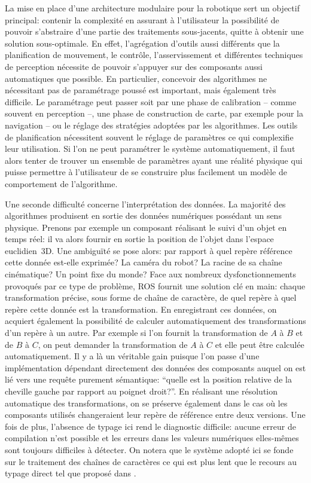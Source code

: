 La mise en place d'une architecture modulaire pour la robotique sert
un objectif principal: contenir la complexité en assurant à
l'utilisateur la possibilité de pouvoir s'abstraire d'une partie des
traitements sous-jacents, quitte à obtenir une solution
sous-optimale. En effet, l'agrégation d'outils aussi différents que la
planification de mouvement, le contrôle, l'asservissement et
différentes techniques de perception nécessite de pouvoir s'appuyer
sur des composants aussi automatiques que possible. En particulier,
concevoir des algorithmes ne nécessitant pas de paramétrage poussé est
important, mais également très difficile. Le paramétrage peut passer
soit par une phase de calibration -- comme souvent en perception --,
une phase de construction de carte, par exemple pour la navigation --
ou le réglage des stratégies adoptées par les algorithmes. Les outils
de planification nécessitent souvent le réglage de paramètres ce qui
complexifie leur utilisation. Si l'on ne peut paramétrer le système
automatiquement, il faut alors tenter de trouver un ensemble de
paramètres ayant une réalité physique qui puisse permettre à
l'utilisateur de se construire plus facilement un modèle de
comportement de l'algorithme.


Une seconde difficulté concerne l'interprétation des données. La
majorité des algorithmes produisent en sortie des données numériques
possédant un sens physique. Prenons par exemple un composant réalisant
le suivi d'un objet en temps réel: il va alors fournir en sortie la
position de l'objet dans l'espace euclidien 3D. Une ambiguïté se pose
alors: par rapport à quel repère référence cette donnée est-elle
exprimée? La caméra du robot? La racine de sa chaîne cinématique? Un
point fixe du monde? Face aux nombreux dysfonctionnements provoqués
par ce type de problème, ROS fournit une solution clé en
main: chaque transformation précise, sous forme de chaîne de
caractère, de quel repère à quel repère cette donnée est la
transformation. En enregistrant ces données, on acquiert également la
possibilité de calculer automatiquement des transformations d'un
repère à un autre. Par exemple si l'on fournit la transformation de
$A$ à $B$ et de $B$ à $C$, on peut demander la transformation de $A$ à
$C$ et elle peut être calculée automatiquement. Il y a là un véritable
gain puisque l'on passe d'une implémentation dépendant directement des
données des composants auquel on est lié vers une requête purement
sémantique: ``quelle est la position relative de la cheville gauche
par rapport au poignet droit?''. En réalisant une résolution
automatique des transformations, on se préserve également dans le cas
où les composants utilisés changeraient leur repère de référence entre
deux versions. Une fois de plus, l'absence de typage ici rend le
diagnostic difficile: aucune erreur de compilation n'est possible et
les erreurs dans les valeurs numériques elles-mêmes sont toujours
difficiles à détecter. On notera que le système adopté ici se fonde
sur le traitement des chaînes de caractères ce qui est plus lent que le
recours au typage direct tel que proposé dans \cite{12delaet.ram}.


